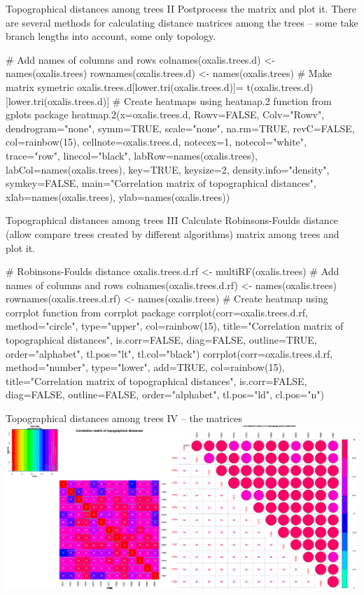 \documentclass[compress, ucs, xelatex, 11pt, xcolor=svgnames,
  hyperref={
    bookmarks=true,
    unicode=true,
    colorlinks=true,
    pdftitle={Molecular data in R},
    plainpages=false,
    pdfauthor={Vojtech Zeisek},
    pdfsubject={Course about phylogeny and evolution in R},
    pdfcreator={XeLaTeX},
    pdfkeywords={R, evolution, phylogeny, molecular data},
    linkcolor=Tomato,
    anchorcolor=SaddleBrown,
    citecolor=Goldenrod,
    filecolor=DarkMagenta,
    menucolor=Sienna,
    urlcolor=DarkTurquoise,
    pdftex},
  url={hyphens, lowtilde} %
  ]{beamer}
\begin{document}
\begin{frame}[fragile]{Topographical distances among trees II}
Postprocess the matrix and plot it. There are several methods for calculating distance matrices among the trees -- some take branch lengths into account, some only topology.
  \begin{spluscode}
    # Add names of columns and rows
    colnames(oxalis.trees.d) <- names(oxalis.trees)
    rownames(oxalis.trees.d) <- names(oxalis.trees)
    # Make matrix symetric
    oxalis.trees.d[lower.tri(oxalis.trees.d)]=
      t(oxalis.trees.d)[lower.tri(oxalis.trees.d)]
    # Create heatmaps using heatmap.2 function from gplots package
    heatmap.2(x=oxalis.trees.d, Rowv=FALSE, Colv="Rowv", dendrogram="none",
      symm=TRUE, scale="none", na.rm=TRUE, revC=FALSE, col=rainbow(15),
      cellnote=oxalis.trees.d, notecex=1, notecol="white", trace="row",
      linecol="black", labRow=names(oxalis.trees),
      labCol=names(oxalis.trees), key=TRUE, keysize=2,
      density.info="density", symkey=FALSE, main="Correlation matrix of
      topographical distances", xlab=names(oxalis.trees),
      ylab=names(oxalis.trees))
  \end{spluscode}
\end{frame}

\begin{frame}[fragile]{Topographical distances among trees III}
Calculate Robinsons-Foulds distance (allow compare trees created by different algorithms) matrix among trees and plot it.
  \begin{spluscode}
    # Robinsons-Foulds distance
    oxalis.trees.d.rf <- multiRF(oxalis.trees)
    # Add names of columns and rows
    colnames(oxalis.trees.d.rf) <- names(oxalis.trees)
    rownames(oxalis.trees.d.rf) <- names(oxalis.trees)
    # Create heatmap using corrplot function from corrplot package
    corrplot(corr=oxalis.trees.d.rf, method="circle", type="upper",
      col=rainbow(15), title="Correlation matrix of topographical
      distances", is.corr=FALSE, diag=FALSE, outline=TRUE,
      order="alphabet", tl.pos="lt", tl.col="black")
    corrplot(corr=oxalis.trees.d.rf, method="number", type="lower",
      add=TRUE, col=rainbow(15), title="Correlation matrix of
      topographical distances", is.corr=FALSE, diag=FALSE,
      outline=FALSE, order="alphabet", tl.pos="ld", cl.pos="n")
  \end{spluscode}
\end{frame}

\begin{frame}{Topographical distances among trees IV -- the matrices}
\includegraphics[width=\textwidth]{oxalis-dist.png}
\end{frame}
\end{document}
